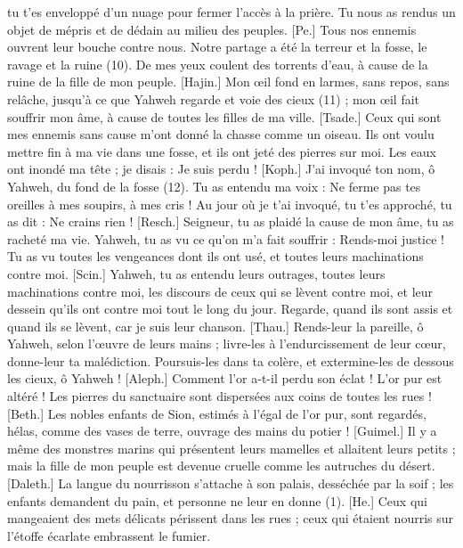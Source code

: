 \begin{multicols}{2}
tu t’es enveloppé d'un nuage pour fermer l’accès à la prière.
Tu nous as rendus un objet de mépris et de dédain au milieu des peuples.
[Pe.] Tous nos ennemis ouvrent leur bouche contre nous.
Notre partage a été la terreur et la fosse, le ravage et la ruine (10).
De mes yeux coulent des torrents d’eau, à cause de la ruine de la fille de mon peuple.
[Hajin.] Mon œil fond en larmes, sans repos, sans relâche,
jusqu’à ce que Yahweh regarde et voie des cieux (11) ;
mon œil fait souffrir mon âme, à cause de toutes les filles de ma ville.
[Tsade.] Ceux qui sont mes ennemis sans cause m’ont donné la chasse comme un oiseau.
Ils ont voulu mettre fin à ma vie dans une fosse, et ils ont jeté des pierres sur moi.
Les eaux ont inondé ma tête ; je disais : Je suis perdu !
[Koph.] J’ai invoqué ton nom, ô Yahweh, du fond de la fosse (12).
Tu as entendu ma voix : Ne ferme pas tes oreilles à mes soupirs, à mes cris !
Au jour où je t’ai invoqué, tu t'es approché, tu as dit : Ne crains rien !
[Resch.] Seigneur, tu as plaidé la cause de mon âme, tu as racheté ma vie.
Yahweh, tu as vu ce qu’on m'a fait souffrir : Rends-moi justice !
Tu as vu toutes les vengeances dont ils ont usé, et toutes leurs machinations contre moi.
[Scin.] Yahweh, tu as entendu leurs outrages, toutes leurs machinations contre moi,
les discours de ceux qui se lèvent contre moi, et leur dessein qu'ils  ont contre moi tout le long du jour.
Regarde, quand ils sont assis et quand ils se lèvent, car je suis leur chanson.
[Thau.] Rends-leur la pareille, ô Yahweh, selon l’œuvre de leurs mains ;
livre-les à l'endurcissement de leur cœur, donne-leur ta malédiction.
Poursuis-les dans ta colère, et extermine-les de dessous les cieux, ô Yahweh !
\VerseOne{}[Aleph.] Comment l’or a-t-il perdu son éclat ! L'or pur est altéré ! Les pierres du sanctuaire sont dispersées aux coins de toutes les rues !
[Beth.] Les nobles enfants de Sion, estimés à l'égal de l'or pur, sont regardés, hélas, comme des vases de terre, ouvrage des mains du potier !
[Guimel.] Il y a même des monstres marins qui présentent leurs mamelles et allaitent leurs petits ; mais la fille de mon peuple est devenue cruelle comme les autruches du désert.
[Daleth.] La langue du nourrisson s'attache à son palais, desséchée par la soif ; les enfants demandent du pain, et personne ne leur en donne (1).
[He.] Ceux qui mangeaient des mets délicats périssent dans les rues ; ceux qui étaient nourris sur l’étoffe écarlate embrassent le fumier.

\end{multicols}
